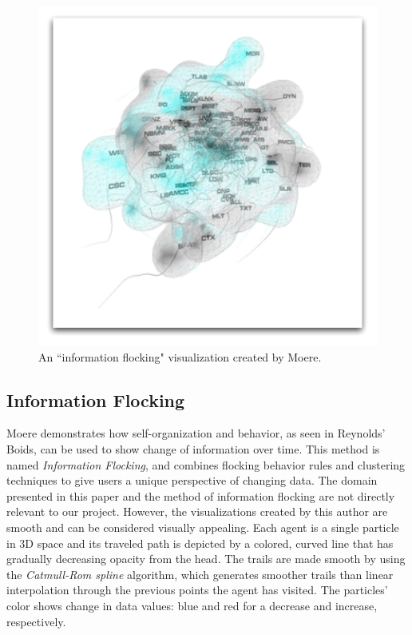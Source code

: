 \documentclass[conference]{IEEEtran}
\begin{document}
\begin{figure}
\centering
\includegraphics[scale=.5]{images/blob.pdf}
\caption{An ``information flocking" visualization created by Moere\cite{1382896}.}
\label{Blob}
\end{figure}

\subsection{Information Flocking}
Moere demonstrates how self-organization and behavior, as seen in Reynolds' Boids, can be used to show change of information over time\cite{1382896}. This method is named {\em Information Flocking}, and combines flocking behavior rules
and clustering techniques to give users a unique perspective of changing data.
The domain presented in this paper and the method of information flocking are not directly relevant to our project.
However, the visualizations created by this author are smooth and can be considered visually appealing.
Each agent is a single particle in 3D space and its traveled path is depicted by a colored,
curved line that has gradually decreasing opacity from the head.
The trails are made smooth by using the {\em Catmull-Rom spline} algorithm,
which generates smoother trails than linear interpolation through the previous points the agent has visited.
The particles' color shows change in data values: blue and red for a decrease and increase, respectively.
\end{document}
